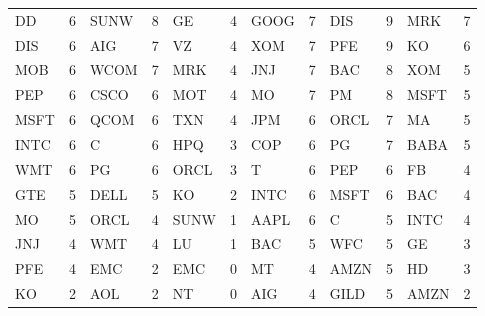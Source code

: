 \begin{table}[]
{\begin{tabular}{|ll|ll|ll|ll|ll|ll|}
DD   & 6  & SUNW & 8  & GE   & 4  & GOOG & 7  & DIS   & 9  & MRK   & 7  \\
DIS  & 6  & AIG  & 7  & VZ   & 4  & XOM  & 7  & PFE   & 9  & KO    & 6  \\
MOB  & 6  & WCOM & 7  & MRK  & 4  & JNJ  & 7  & BAC   & 8  & XOM   & 5  \\
PEP  & 6  & CSCO & 6  & MOT  & 4  & MO   & 7  & PM    & 8  & MSFT  & 5  \\
MSFT & 6  & QCOM & 6  & TXN  & 4  & JPM  & 6  & ORCL  & 7  & MA    & 5  \\
INTC & 6  & C    & 6  & HPQ  & 3  & COP  & 6  & PG    & 7  & BABA  & 5  \\
WMT  & 6  & PG   & 6  & ORCL & 3  & T    & 6  & PEP   & 6  & FB    & 4  \\
GTE  & 5  & DELL & 5  & KO   & 2  & INTC & 6  & MSFT  & 6  & BAC   & 4  \\
MO   & 5  & ORCL & 4  & SUNW & 1  & AAPL & 6  & C     & 5  & INTC  & 4  \\
JNJ  & 4  & WMT  & 4  & LU   & 1  & BAC  & 5  & WFC   & 5  & GE    & 3  \\
PFE  & 4  & EMC  & 2  & EMC  & 0  & MT   & 4  & AMZN  & 5  & HD    & 3  \\
KO   & 2  & AOL  & 2  & NT   & 0  & AIG  & 4  & GILD  & 5  & AMZN  & 2  \\ \hline
\end{tabular}}
\label{outdegree}
\end{table}




